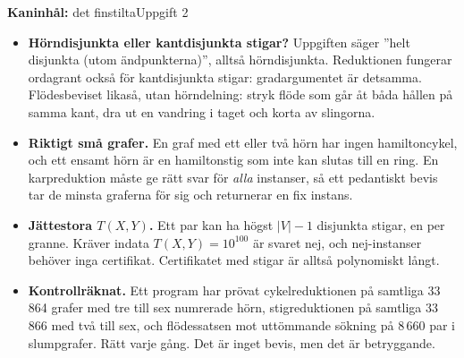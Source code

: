 \documentclass[aspectratio=169,10pt]{beamer}
\newcommand{\rabbit}{\textcolor{warnorange}{\textbf{Kaninhål:}} }
\begin{document}
\begin{frame}{\rabbit det finstilta}{Uppgift 2}
  \begin{itemize}
    \item<1-> \textbf{Hörndisjunkta eller kantdisjunkta stigar?} Uppgiften säger ''helt disjunkta (utom ändpunkterna)'', alltså hörndisjunkta. Reduktionen fungerar ordagrant också för kantdisjunkta stigar: gradargumentet är detsamma. Flödesbeviset likaså, utan hörndelning: stryk flöde som går åt båda hållen på samma kant, dra ut en vandring i taget och korta av slingorna.
    \item<2-> \textbf{Riktigt små grafer.} En graf med ett eller två hörn har ingen hamiltoncykel, och ett ensamt hörn är en hamiltonstig som inte kan slutas till en ring. En karpreduktion måste ge rätt svar för \emph{alla} instanser, så ett pedantiskt bevis tar de minsta graferna för sig och returnerar en fix instans.
    \item<3-> \textbf{Jättestora $T(X,Y)$.} Ett par kan ha högst $|V|-1$ disjunkta stigar, en per granne. Kräver indata $T(X,Y)=10^{100}$ är svaret nej, och nej-instanser behöver inga certifikat. Certifikatet med stigar är alltså polynomiskt långt.
    \item<4-> \textbf{Kontrollräknat.} Ett program har prövat cykelreduktionen på samtliga 33\,864 grafer med tre till sex numrerade hörn, stigreduktionen på samtliga 33\,866 med två till sex, och flödessatsen mot uttömmande sökning på 8\,660 par i slumpgrafer. Rätt varje gång. Det är inget bevis, men det är betryggande.
  \end{itemize}
\end{frame}
\end{document}
